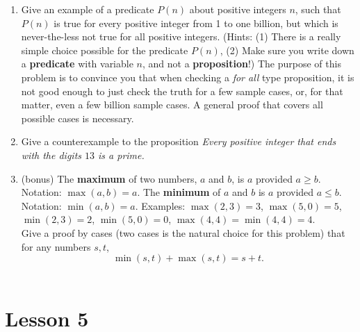 \documentclass[11pt]{amsart}
\begin{document}
\begin{enumerate}
\item  Give an example of a predicate $P(n)$ about positive integers $n$, such that
$P(n)$ is true for every positive integer from 1 to one billion, but which is never-the-less not
true for all positive integers.  (Hints:  (1) There is a really simple choice possible for the predicate
$P(n)$, (2) Make sure you write down a {\bfseries predicate} with variable $n$, and not a {\bf proposition}!)
The purpose of this problem is to convince you that when checking a
{\it for all}
type proposition, it is not good enough to just check the truth for a few sample cases,
or, for that matter, even a few billion sample cases.  A general proof that covers all
possible cases is necessary.\\[5pt]

\item Give a counterexample to the proposition {\it Every positive
integer that ends with the digits $13$ is a prime.}\\[5pt]

\item(bonus) 
The {\bfseries maximum} of two numbers, $a$ and $b$, is $a$ provided $a\geq b$. Notation: $\max(a,b) = a$. The {\bfseries minimum}
of $a$ and $b$ is $a$ provided $a\leq b$. Notation: $\min(a,b) = a$.  Examples: $\max(2,3) = 3$, $\max(5,0) = 5$, $\min(2,3) = 2$,
$\min(5,0) = 0$, $\max(4,4) = \min(4,4) = 4$.\\
Give a proof by cases (two cases is the natural choice for this problem)  that for any numbers $s,t$,
\[\min(s,t)+\max(s,t) = s+t.\]\\[5pt]
\end{enumerate}

\section{Lesson 5}
\end{document}
